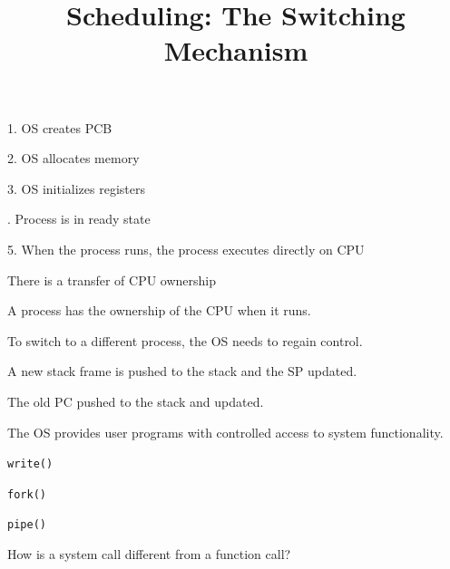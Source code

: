 

\title{Scheduling: The Switching Mechanism}



\begin{frame}
    \titlepage
\end{frame}

\begin{slide}

    
    \begin{minipage}{0.5\textwidth}
    1. OS creates PCB
    \medskip
    
    2. OS allocates memory
    \medskip
    
    3. OS initializes registers
    
    . Process is in ready state
    \medskip
    
    5. When the process runs, the process executes directly on CPU
    
    \bigskip
    There is a transfer of CPU ownership
    \end{minipage}
    
\end{slide}

\begin{slide}

    
    A process has the ownership of the CPU when it runs.
    \bigskip
    
    To switch to a different process, the OS needs to regain control.

\end{slide}

\begin{slide}


    A new stack frame is pushed to the stack and the SP updated.
    \bigskip
    
    The old PC pushed to the stack and updated.
    
\end{slide}

\begin{slide}

    
    The OS provides user programs with controlled access to system functionality.
    \bigskip
    
    \texttt{write()}
    \medskip
    
    \texttt{fork()}
    \medskip
    
    \texttt{pipe()}
    \bigskip
    
    How is a system call different from a function call?
    
\end{slide}

